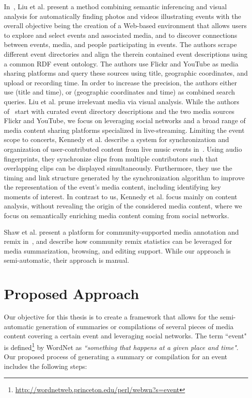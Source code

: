 \documentclass[runningheads,a4paper]{llncs}
\begin{document}
In~\cite{Liu:2011:FMI:1991996.1992054}, Liu et al. present a method combining semantic inferencing and visual analysis for automatically finding photos and videos illustrating events with the overall objective being the creation of a Web-based environment that allows users to explore and select events and associated media, and to discover connections between events, media, and people participating in events. The authors scrape different event directories and align the therein contained event descriptions using a common RDF event ontology. The authors use Flickr and YouTube as media sharing platforms and query these sources using title, geographic coordinates, and upload or recording time. In order to increase the precision, the authors either use (title and time), or (geographic coordinates and time) as combined search queries. Liu et al. prune irrelevant media via visual analysis. While the authors of~\cite{Liu:2011:FMI:1991996.1992054} start with curated event directory descriptions and the two media sources Flickr and YouTube, we focus on leveraging social networks and a broad range of media content sharing platforms specialized in live-streaming. Limiting the event scope to concerts, Kennedy et al. describe a system for synchronization and organization of user-contributed content from live music events in~\cite{Kennedy:2009:LTM:1526709.1526752}. Using audio fingerprints, they synchronize clips from multiple contributors such that overlapping clips can be displayed simultaneously. Furthermore, they use the timing and link structure generated by the synchronization algorithm to improve the representation of the event's media content, including identifying key moments of interest. In contrast to us, Kennedy et al. focus mainly on content analysis, without revealing the origin of the considered media content, where we focus on semantically enriching media content coming from social networks.

Shaw et al. present a platform for community-supported media annotation and remix in~\cite{Shaw06communityannotation}, and describe how community remix statistics can be leveraged for media summarization, browsing, and editing support. While our approach is semi-automatic, their approach is manual. 

\section{Proposed Approach}
Our objective for this thesis is to create a framework that allows for the semi-automatic generation of summaries or compilations of several pieces of media content covering a certain event and leveraging social networks. The term ``event" is defined\footnote{\url{http://wordnetweb.princeton.edu/perl/webwn?s=event}} by WordNet as \textit{``something that happens at a given place and time"}. Our proposed process of generating a summary or compilation for an event includes the following steps:
\end{document}
